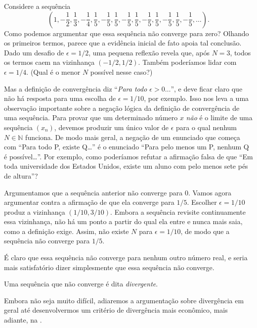 \begin{example}\label{exmpl:2-2-8}
Considere a sequência
\[
\left( 1, -\frac{1}{2}, \frac{1}{3}, -\frac{1}{4}, \frac{1}{5}, -\frac{1}{5}, \frac{1}{5}, -\frac{1}{5}, \frac{1}{5}, -\frac{1}{5}, \frac{1}{5}, -\frac{1}{5}, \frac{1}{5}, -\frac{1}{5}, \dots \right).
\]
Como podemos argumentar que essa sequência não converge para zero? Olhando os primeiros termos, parece que a evidência inicial de fato apoia tal conclusão. Dado um desafio de $\epsilon = 1/2$, uma pequena reflexão revela que, após $N = 3$, todos os termos caem na vizinhança $(-1/2, 1/2)$. Também poderíamos lidar com $\epsilon = 1/4$. (Qual é o menor $N$ possível nesse caso?)

Mas a definição de convergência diz ``\textit{Para todo $\epsilon > 0 \dots$}'', e deve ficar claro que não há resposta para uma escolha de $\epsilon = 1/10$, por exemplo. Isso nos leva a uma observação importante sobre a negação lógica da definição de convergência de uma sequência. Para provar que um determinado número $x$ \textit{não} é o limite de uma sequência $(x_n)$, devemos produzir um único valor de $\epsilon$ para o qual nenhum $N \in \mathbb{N}$ funciona. De modo mais geral, a negação de um enunciado que começa com ``Para todo P, existe Q\dots'' é o enunciado ``Para pelo menos um P, nenhum Q é possível\dots''. Por exemplo, como poderíamos refutar a afirmação falsa de que ``Em toda universidade dos Estados Unidos, existe um aluno com pelo menos sete pés de altura''?

Argumentamos que a sequência anterior não converge para $0$. Vamos agora argumentar contra a afirmação de que ela converge para $1/5$. Escolher $\epsilon = 1/10$ produz a vizinhança $(1/10, 3/10)$. Embora a sequência revisite continuamente essa vizinhança, não há um ponto a partir do qual ela entre e nunca mais saia, como a definição exige. Assim, não existe $N$ para $\epsilon = 1/10$, de modo que a sequência não converge para $1/5$.
\end{example}

É claro que essa sequência não converge para nenhum outro número real, e seria mais satisfatório dizer simplesmente que essa sequência não converge.

\begin{definition}\label{def:divergencia}
Uma sequência que não converge é dita \textit{divergente}. 
\end{definition}

Embora não seja muito difícil, adiaremos a argumentação sobre divergência em geral até desenvolvermos um critério de divergência mais econômico, mais adiante, na .

